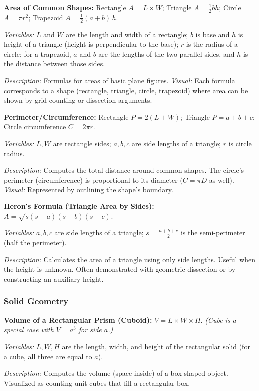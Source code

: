 \documentclass{article}
\begin{document}
\textbf{Area of Common Shapes:} Rectangle $A = L \times W$; Triangle $A = \frac{1}{2} b h$; Circle $A = \pi r^2$; Trapezoid $A = \frac{1}{2}(a+b)\,h$.

\textit{Variables:} $L$ and $W$ are the length and width of a rectangle; $b$ is base and $h$ is height of a triangle (height is perpendicular to the base); $r$ is the radius of a circle; for a trapezoid, $a$ and $b$ are the lengths of the two parallel sides, and $h$ is the distance between those sides.

\textit{Description:} Formulas for areas of basic plane figures. \textit{Visual:} Each formula corresponds to a shape (rectangle, triangle, circle, trapezoid) where area can be shown by grid counting or dissection arguments.

\textbf{Perimeter/Circumference:} Rectangle $P = 2(L+W)$; Triangle $P = a + b + c$; Circle circumference $C = 2\pi r$.

\textit{Variables:} $L, W$ are rectangle sides; $a,b,c$ are side lengths of a triangle; $r$ is circle radius.

\textit{Description:} Computes the total distance around common shapes. The circle’s perimeter (circumference) is proportional to its diameter ($C = \pi D$ as well). \textit{Visual:} Represented by outlining the shape’s boundary.

\textbf{Heron's Formula (Triangle Area by Sides):} $A = \sqrt{s(s-a)(s-b)(s-c)}$.

\textit{Variables:} $a, b, c$ are side lengths of a triangle; $s = \frac{a+b+c}{2}$ is the semi-perimeter (half the perimeter).

\textit{Description:} Calculates the area of a triangle using only side lengths. Useful when the height is unknown. Often demonstrated with geometric dissection or by constructing an auxiliary height.

\subsubsection*{Solid Geometry}

\textbf{Volume of a Rectangular Prism (Cuboid):} $V = L \times W \times H$. \textit{(Cube is a special case with $V=a^3$ for side $a$.)}

\textit{Variables:} $L, W, H$ are the length, width, and height of the rectangular solid (for a cube, all three are equal to $a$).

\textit{Description:} Computes the volume (space inside) of a box-shaped object. Visualized as counting unit cubes that fill a rectangular box.
\end{document}
